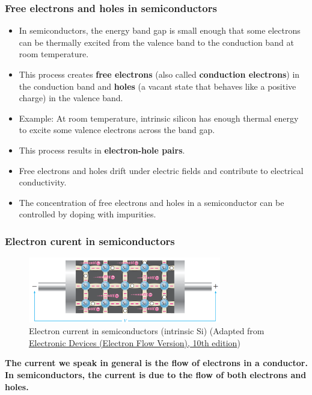 \begin{frame}
	\frametitle{Free electrons and holes in semiconductors}
            \begin{itemize}
                \item In semiconductors, the energy band gap is small enough that some electrons can be thermally excited from the valence band to the conduction band at room temperature.
                \item This process creates \textbf{free electrons} (also called \textbf{conduction electrons}) in the conduction band and \textbf{holes} (a vacant state that behaves like a positive charge) in the valence band.
                \item  Example: At room temperature, intrinsic silicon has enough thermal energy to excite some valence electrons across the band gap.
                \item This process results in \textbf{electron-hole pairs}.
                \item Free electrons and holes drift under electric fields and contribute to electrical conductivity.
                \item The concentration of free electrons and holes in a semiconductor can be controlled by doping with impurities.
            \end{itemize}
\end{frame}

\begin{frame}
	\frametitle{Electron curent in semiconductors}
    \begin{figure}
        \centering
        \includegraphics[width=0.75\textwidth]{fig/lec02/electron_current.png}
        \caption{Electron current in semiconductors (intrinsic Si) (Adapted from \href{https://www.pearson.com/en-us/subject-catalog/p/electronic-devices-electron-flow-version/P200000001048/9780137556755}{Electronic Devices (Electron Flow Version), 10th edition})}
    \end{figure}
    \textbf{The current we speak in general is the flow of electrons in a conductor. In semiconductors, the current is due to the flow of both electrons and holes.}
\end{frame}

